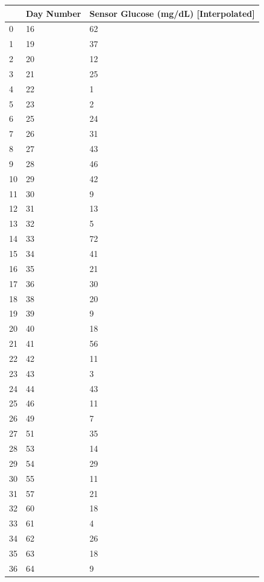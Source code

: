 \bigskip\noindent
\begin{tabular}{p{}p{}p{}}
\toprule
 & Day Number & Sensor Glucose (mg/dL) [Interpolated] \\
\hline
0 & 16 & 62 \\
\hline
1 & 19 & 37 \\
\hline
2 & 20 & 12 \\
\hline
3 & 21 & 25 \\
\hline
4 & 22 & 1 \\
\hline
5 & 23 & 2 \\
\hline
6 & 25 & 24 \\
\hline
7 & 26 & 31 \\
\hline
8 & 27 & 43 \\
\hline
9 & 28 & 46 \\
\hline
10 & 29 & 42 \\
\hline
11 & 30 & 9 \\
\hline
12 & 31 & 13 \\
\hline
13 & 32 & 5 \\
\hline
14 & 33 & 72 \\
\hline
15 & 34 & 41 \\
\hline
16 & 35 & 21 \\
\hline
17 & 36 & 30 \\
\hline
18 & 38 & 20 \\
\hline
19 & 39 & 9 \\
\hline
20 & 40 & 18 \\
\hline
21 & 41 & 56 \\
\hline
22 & 42 & 11 \\
\hline
23 & 43 & 3 \\
\hline
24 & 44 & 43 \\
\hline
25 & 46 & 11 \\
\hline
26 & 49 & 7 \\
\hline
27 & 51 & 35 \\
\hline
28 & 53 & 14 \\
\hline
29 & 54 & 29 \\
\hline
30 & 55 & 11 \\
\hline
31 & 57 & 21 \\
\hline
32 & 60 & 18 \\
\hline
33 & 61 & 4 \\
\hline
34 & 62 & 26 \\
\hline
35 & 63 & 18 \\
\hline
36 & 64 & 9 \\

\end{tabular}
